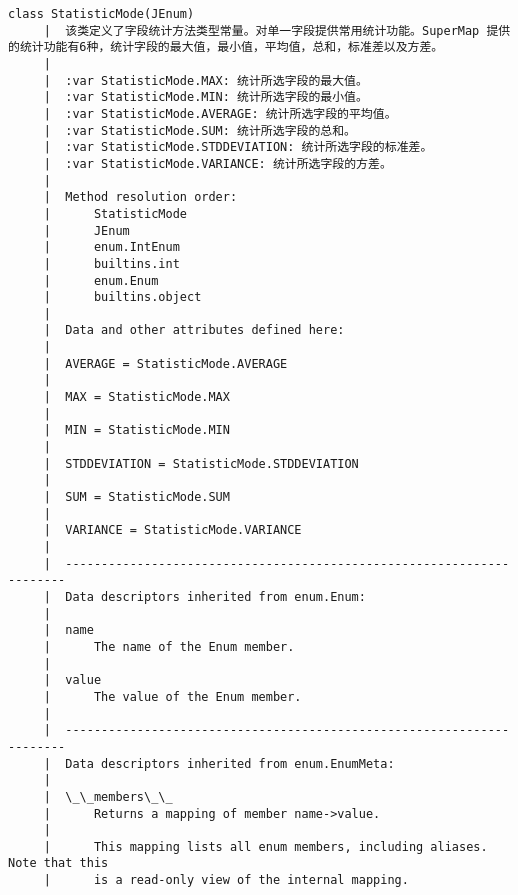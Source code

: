 \documentclass[11pt]{article}
\begin{document}
\begin{Verbatim}[commandchars=\\\{\}]
    class StatisticMode(JEnum)
     |  该类定义了字段统计方法类型常量。对单一字段提供常用统计功能。SuperMap 提供的统计功能有6种，统计字段的最大值，最小值，平均值，总和，标准差以及方差。
     |  
     |  :var StatisticMode.MAX: 统计所选字段的最大值。
     |  :var StatisticMode.MIN: 统计所选字段的最小值。
     |  :var StatisticMode.AVERAGE: 统计所选字段的平均值。
     |  :var StatisticMode.SUM: 统计所选字段的总和。
     |  :var StatisticMode.STDDEVIATION: 统计所选字段的标准差。
     |  :var StatisticMode.VARIANCE: 统计所选字段的方差。
     |  
     |  Method resolution order:
     |      StatisticMode
     |      JEnum
     |      enum.IntEnum
     |      builtins.int
     |      enum.Enum
     |      builtins.object
     |  
     |  Data and other attributes defined here:
     |  
     |  AVERAGE = StatisticMode.AVERAGE
     |  
     |  MAX = StatisticMode.MAX
     |  
     |  MIN = StatisticMode.MIN
     |  
     |  STDDEVIATION = StatisticMode.STDDEVIATION
     |  
     |  SUM = StatisticMode.SUM
     |  
     |  VARIANCE = StatisticMode.VARIANCE
     |  
     |  ----------------------------------------------------------------------
     |  Data descriptors inherited from enum.Enum:
     |  
     |  name
     |      The name of the Enum member.
     |  
     |  value
     |      The value of the Enum member.
     |  
     |  ----------------------------------------------------------------------
     |  Data descriptors inherited from enum.EnumMeta:
     |  
     |  \_\_members\_\_
     |      Returns a mapping of member name->value.
     |      
     |      This mapping lists all enum members, including aliases. Note that this
     |      is a read-only view of the internal mapping.
    

\end{Verbatim}
\end{document}
